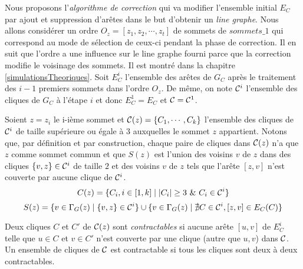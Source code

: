Nous proposons l'{\em algorithme de correction} qui va modifier l'ensemble initial $E_C$ par ajout et suppression d'ar\^etes dans le but d'obtenir un {\em line graphe}.
Nous allons consid\'erer un ordre $O_z = [z_1, z_2, \cdots, z_t]$ de sommets de $sommets\_1$ qui correspond au mode de s\'election de ceux-ci pendant la phase de correction.
Il en suit que l'ordre a une influence sur le line graphe fourni parce que la correction modifie le voisinage des sommets. Il est montr\'e dans la chapitre \ref{simulationsTheoriques}.
\newline
Soit $E_C^i$ l'ensemble des ar\^etes de $G_C$ apr\`es le traitement des $i-1$ premiers sommets dans l'ordre $O_z$. De m\^eme, on note ${\cal C}^i$ l'ensemble des cliques de $G_C$ \`a l'\'etape $i$ et donc $E_C^1 = E_C$ et ${\cal C} = {\cal C}^1$.
\newline

Soient $z=z_i$ le i-i\`eme sommet et ${\cal C}(z) = \{C_1, \cdots, C_k\}$ l'ensemble des cliques de ${\cal C}^i$ de taille sup\'erieure ou \'egale \`a $3$ auxquelles le sommet $z$ appartient.
Notons que, par d\'efinition et par construction, chaque paire de cliques dans ${\cal C}(z)$ n'a que $z$ comme sommet commun et que $S(z)$ est l'union des voisins $v$ de $z$ dans des cliques $\{v,z\} \in {\cal C}^i$ de taille $2$ et des voisins $v$ de $z$ tels que l'ar\^ete $[z,v]$ n'est couverte par aucune clique de ${\cal C}^i$.
\begin{equation}
C(z) = \{C_i, i \in [1,k] \mid  |C_i| \ge 3 \mbox{ } \&  \mbox{ } C_i \in {\cal C}^i \} 
\end{equation}
\begin{equation}
S(z) = \{v \in \Gamma_G(z) \mid \{v,z\} \in {\cal C}^i\} \cup  \{ v \in \Gamma_G(z) \mid \nexists C \in {\cal C}^{i} , [z,v] \in E_C(C) \}
\end{equation}

\begin{definition}
Deux cliques $C$ et $C'$ de ${\cal C}(z)$ sont {\em contractables} si aucune ar\^ete $[u,v]$ de $E_C^i$ telle que $u \in C$ et $v \in C'$ n'est couverte par une clique (autre que ${u,v}$) dans $\cal C$.
Un ensemble de cliques de $\cal C$ est contractable si tous les cliques sont deux \`a deux contractables.
\end{definition}

